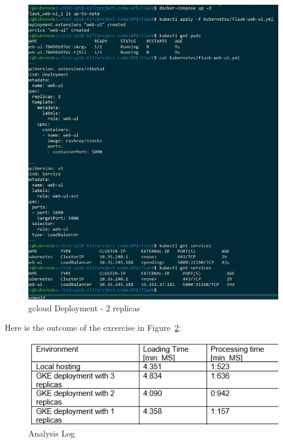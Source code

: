 \begin{figure}[htb]
	\centering\includegraphics[width=\columnwidth]{images/hid_417_gcloud_2replicas_console_benchmark.png}
  \caption{gcloud Deployment - 2 replicas}
  \label{fig:project_deployment}
\end{figure}

Here is the outcome of the excercise in Figure~\ref{fig:project_benchmark}:

\begin{figure}[htb]
	\centering\includegraphics[width=\columnwidth]{images/hid_417_benchmark.png}
  \caption{Analysis Log}
  \label{fig:project_benchmark}
\end{figure}

